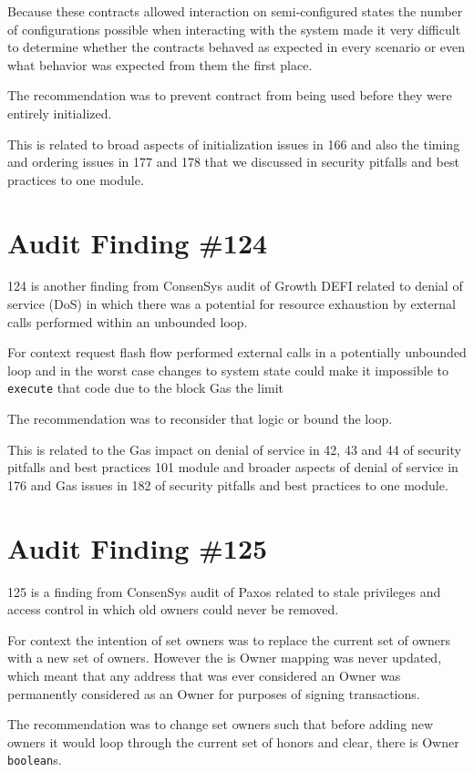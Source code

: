 Because these contracts allowed interaction on semi-configured states the number of configurations possible when interacting with the system made it very difficult to determine whether the contracts behaved as expected in every scenario or even what behavior was expected from them the first place.

The recommendation was to prevent contract from being used before they were entirely initialized.

This is related to broad aspects of initialization issues in 166 and also the timing and ordering issues in 177 and 178 that we discussed in security pitfalls and best practices to one module.

\section{Audit Finding \#124}

124 is another finding from ConsenSys audit of Growth DEFI related to denial of service (DoS) in which there was a potential for resource exhaustion by external calls performed within an unbounded loop. 

For context request flash flow performed external calls in a potentially unbounded loop and in the worst case changes to system state could make it impossible to \verb|execute| that code due to the block Gas the limit 

The recommendation was to reconsider that logic or bound the loop.

This is related to the Gas impact on denial of service in 42, 43 and 44 of security pitfalls and best practices 101 module and broader aspects of denial of service in 176 and Gas issues in 182 of security pitfalls and best practices to one module.

\section{Audit Finding \#125}

125 is a finding from ConsenSys audit of Paxos related to stale privileges and access control in which old owners could never be removed. 

For context the intention of set owners was to replace the current set of owners with a new set of owners. However the is Owner mapping was never updated, which meant that any address that was ever considered an Owner was permanently considered as an Owner for purposes of signing transactions.

The recommendation was to change set owners such that before adding new owners it would loop through the current set of honors and clear, there is Owner \verb|boolean|s.

